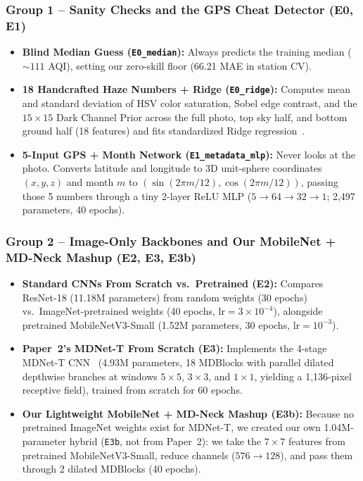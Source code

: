 \documentclass[conference]{IEEEtran}
\begin{document}
\subsubsection{Group 1 -- Sanity Checks and the GPS Cheat Detector (E0, E1)}

\begin{itemize}
  \item \textbf{Blind Median Guess (\texttt{E0\_median}):} Always predicts the
        training median ($\sim 111$ AQI), setting our zero-skill floor (66.21
        MAE in station CV).
  \item \textbf{18 Handcrafted Haze Numbers + Ridge (\texttt{E0\_ridge}):}
        Computes mean and standard deviation of HSV color saturation, Sobel edge
        contrast, and the $15 \times 15$ Dark Channel Prior across the full
        photo, top sky half, and bottom ground half (18 features) and fits
        standardized Ridge regression~\cite{marzaguiReviewImageQuality2024,
        chakrabortyCanImageTell2024}.
  \item \textbf{5-Input GPS + Month Network (\texttt{E1\_metadata\_mlp}):} Never
        looks at the photo. Converts latitude and longitude to 3D unit-sphere
        coordinates $(x, y, z)$ and month $m$ to
        $(\sin(2\pi m/12), \cos(2\pi m/12))$, passing those 5 numbers through a
        tiny 2-layer ReLU MLP ($5 \to 64 \to 32 \to 1$; 2,497 parameters, 40
        epochs).
\end{itemize}

\subsubsection{
  Group 2 -- Image-Only Backbones and Our MobileNet + MD-Neck Mashup (E2, E3,
  E3b)
}

\begin{itemize}
  \item \textbf{Standard CNNs From Scratch vs.\ Pretrained (E2):} Compares
        ResNet-18 (11.18M parameters) from random weights (30 epochs) vs.\
        ImageNet-pretrained weights (40 epochs, $\text{lr} = 3 \times 10^{-4}$),
        alongside pretrained MobileNetV3-Small (1.52M parameters, 30 epochs,
        $\text{lr} = 10^{-3}$).
  \item \textbf{Paper~2's MDNet-T From Scratch (E3):} Implements the 4-stage
        MDNet-T CNN~\cite{wangLightweightAirQuality2024} (4.93M parameters, 18
        MDBlocks with parallel dilated depthwise branches at windows
        $5 \times 5$, $3 \times 3$, and $1 \times 1$, yielding a 1,136-pixel
        receptive field), trained from scratch for 60 epochs.
  \item \textbf{Our Lightweight MobileNet + MD-Neck Mashup (E3b):} Because no
        pretrained ImageNet weights exist for MDNet-T, we created our own
        1.04M-parameter hybrid (\texttt{E3b}, not from Paper~2): we take the
        $7 \times 7$ features from pretrained MobileNetV3-Small, reduce channels
        ($576 \to 128$), and pass them through 2 dilated MDBlocks (40 epochs).
\end{itemize}
\end{document}
